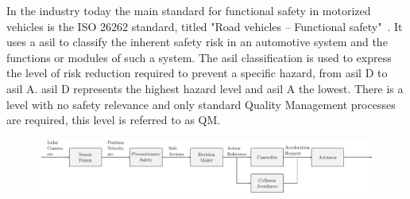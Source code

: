 In the industry today the main standard for functional safety in motorized vehicles is the ISO 26262 standard, titled "Road vehicles – Functional safety"~\cite{ISO26262}. It uses a \gls{asil} to classify the inherent safety risk in an automotive system and the functions or modules of such a system. The \gls{asil} classification is used to express the level of risk reduction required to prevent a specific hazard, from \gls{asil} D to \gls{asil} A. \gls{asil} D represents the highest hazard level and \gls{asil} A the lowest. There is a level with no safety relevance and only standard Quality Management processes are required, this level is referred to as QM.

\begin{figure}[h]
	\centering
	 \includegraphics[width=\linewidth]{YourThesis/chapters/figures/pomdp/figures-system_architecture.pdf}
%
%		
%
%		
%

\end{figure}
